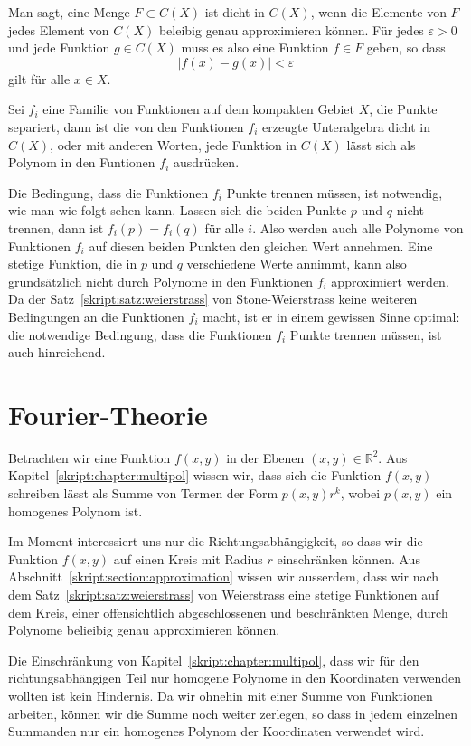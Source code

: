 Man sagt, eine Menge $F\subset C(X)$ ist dicht in $C(X)$, wenn die Elemente
von $F$ jedes Element von $C(X)$ beleibig genau approximieren können.
Für jedes $\varepsilon>0$ und jede Funktion $g\in C(X)$ muss es also eine
Funktion $f\in F$ geben, so dass
\[
|f(x)-g(x)|< \varepsilon
\]
gilt für alle $x\in X$.

\begin{satz}
Sei $f_i$ eine Familie von Funktionen auf dem kompakten Gebiet $X$,
die Punkte separiert, dann ist die von den Funktionen $f_i$ erzeugte
Unteralgebra dicht in $C(X)$, oder mit anderen Worten, jede Funktion
in $C(X)$ lässt sich als Polynom in den Funtionen $f_i$ ausdrücken.
\end{satz}

Die Bedingung, dass die Funktionen $f_i$ Punkte trennen müssen, ist
notwendig, wie man wie folgt sehen kann.
Lassen sich die beiden Punkte $p$ und $q$ nicht trennen, dann
ist $f_i(p)=f_i(q)$ für alle $i$.
Also werden auch alle Polynome von Funktionen $f_i$ auf diesen beiden 
Punkten den gleichen Wert annehmen.
Eine stetige Funktion, die in $p$ und $q$ verschiedene Werte annimmt,
kann also grundsätzlich nicht durch Polynome in den Funktionen
$f_i$ approximiert werden.
Da der Satz~\ref{skript:satz:weierstrass} von Stone-Weierstrass
keine weiteren Bedingungen an die Funktionen $f_i$ macht, ist er
in einem gewissen Sinne optimal: die notwendige Bedingung, dass
die Funktionen $f_i$ Punkte trennen müssen, ist auch hinreichend.

\section{Fourier-Theorie}
Betrachten wir eine Funktion $f(x,y)$ in der Ebenen $(x,y)\in\mathbb R^2$.
Aus Kapitel~\ref{skript:chapter:multipol} wissen wir, dass sich die Funktion
$f(x,y)$ schreiben lässt als Summe von Termen der Form $p(x,y)r^k$, wobei
$p(x,y)$ ein homogenes Polynom ist.

Im Moment interessiert uns nur die Richtungsabhängigkeit, so dass wir
die Funktion $f(x,y)$ auf einen Kreis mit Radius $r$ einschränken können.
Aus Abschnitt~\ref{skript:section:approximation} wissen wir ausserdem,
dass wir nach dem Satz~\ref{skript:satz:weierstrass} von Weierstrass
eine stetige Funktionen auf dem Kreis, einer offensichtlich
abgeschlossenen und beschränkten Menge, durch Polynome belieibig
genau approximieren können.

Die Einschränkung von Kapitel~\ref{skript:chapter:multipol}, dass wir
für den richtungsabhängigen Teil nur homogene Polynome in den Koordinaten
verwenden wollten ist kein Hindernis.
Da wir ohnehin mit einer Summe von Funktionen arbeiten, können wir
die Summe noch weiter zerlegen, so dass in jedem einzelnen Summanden nur ein
homogenes Polynom der Koordinaten verwendet wird.

